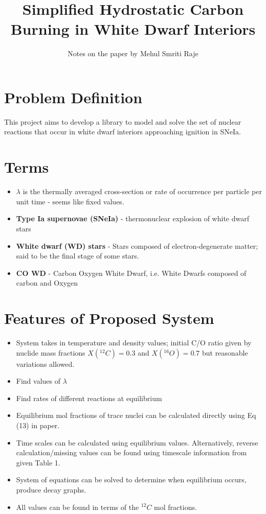 \documentclass[11pt]{article}
\title{Simplified Hydrostatic Carbon Burning in White Dwarf Interiors}
\author{Notes on the paper by Mehul Smriti Raje}
\begin{document}
\maketitle{}

\section{Problem Definition}
This project aims to develop a library to model and solve the set of nuclear reactions that occur in white dwarf interiors approaching ignition in SNeIa.

\section{Terms}
	\begin{itemize}
		\item $\lambda$ is the thermally averaged cross-section or rate of occurrence per particle per unit time - seems like fixed values.
		\item \textbf{Type Ia supernovae (SNeIa)} - thermonuclear explosion of white dwarf stars
		\item \textbf{White dwarf (WD) stars} - Stars composed of electron-degenerate matter; said to be the final stage of some stars.
		\item \textbf{CO WD} - Carbon Oxygen White Dwarf, i.e. White Dwarfs composed of carbon and Oxygen
	\end{itemize}

\section{Features of Proposed System}
	\begin{itemize}
		\item System takes in temperature and density values; initial C/O ratio given by nuclide mass fractions $X(^{12}C) = 0.3$ and $X(^{16}O) = 0.7$ but reasonable variations allowed.
		\item Find values of $\lambda$ 
		\item Find rates of different reactions at equilibrium
		\item Equilibrium mol fractions of trace nuclei can be calculated directly using Eq (13) in paper.
		\item Time scales can be calculated using equilibrium values. Alternatively, reverse calculation/missing values can be found using timescale information from given Table 1.
		\item System of equations can be solved to determine when equilibrium occurs, produce decay graphs.
		\item All values can be found in terms of the $^{12}C$ mol fractions.
	\end{itemize}	
	
\end{document}
